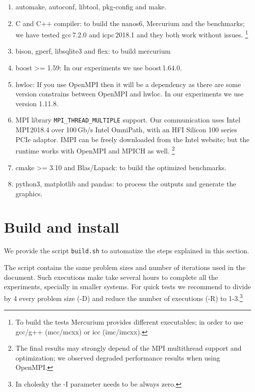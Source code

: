 \documentclass{article}
\newcommand{\code}[1]{\texttt{#1}}
\begin{document}
\begin{enumerate}
    \item automake, autoconf, libtool, pkg-config and make.

    \item C and C++ compiler: to build the nanos6, Mercurium and the benchmarks;
        we have tested gcc\,7.2.0 and icpc\,2018.1 and they both work without
        issues.
        \footnote{To build the tests Mercurium provides different executables;
        in order to use gcc/g++ (mcc/mcxx) or icc (imc/imcxx).}

    \item bison, gperf, libsqlite3 and flex: to build mercurium

    \item boost >= 1.59: In our experiments we use boost\,1.64.0.

    \item hwloc: If you use OpenMPI then it will be a dependency as there are some
        version constrains between OpenMPI and hwloc. In our experiments we use
        version 1.11.8.

    \item MPI library \code{MPI\_THREAD\_MULTIPLE} support. Our communication
        uses Intel MPI\,2018.4 over 100\,Gb/s Intel OmniPath, with an HFI Silicon
        100 series PCIe adaptor.  IMPI can be freely downloaded from the Intel
        website; but the runtime works with OpenMPI and MPICH as well.
        \footnote{The final results may strongly depend of the MPI multithread
        support and optimization; we observed degraded performance results
        when using OpenMPI.}

    \item cmake >= 3.10 and Blas/Lapack: to build the optimized benchmarks.

    \item python3, matplotlib and pandas: to process the outputs and generate the graphics.

\end{enumerate}

\section{Build and install}

We provide the script \code{build.sh} to automatize the steps
explained in this section.

The script contains the same problem sizes and number of
iterations used in the document. Such executions make take several
hours to complete all the experiments, specially in smaller
systems. For quick tests we recommend to divide by 4 every problem
size (-D) and reduce the number of executions (-R) to 1-3.\footnote{In
  cholesky the -I parameter needs to be always zero.}
\end{document}
